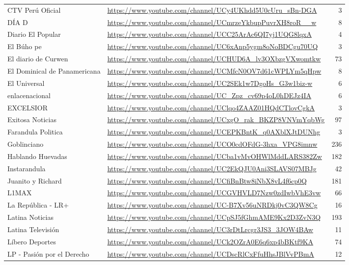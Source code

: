 \begin{longtable}{>{\raggedright\arraybackslash}p{50mm}>{\raggedright\arraybackslash}p{103mm}r}
CTV Perú Oficial & \url{https://www.youtube.com/channel/UCy4UKhdd5U0cUru_sBn-DGA} & 3 \\
DÍA D & \url{https://www.youtube.com/channel/UCmrzeYkbupPuvrXH8roR__w} & 8 \\
Diario El Popular & \url{https://www.youtube.com/channel/UCC25ArAc6QI7yj1UQG8lqxA} & 4 \\
El Búho pe & \url{https://www.youtube.com/channel/UC6xAnp5ygm8oNoBDCgu70UQ} & 3 \\
El diario de Curwen & \url{https://www.youtube.com/channel/UCHUD6A_lv3OXbzgVXwomtkw} & 73 \\
El Dominical de Panamericana & \url{https://www.youtube.com/channel/UCMfcN0OV7d61cWPLYm5qHpw} & 8 \\
El Universal & \url{https://www.youtube.com/channel/UC2SEk1w7DgoHs_G3w1biz-w} & 6 \\
enlacenacional & \url{https://www.youtube.com/channel/UC_Zpz_cv69p4oL0hDEJz4IA} & 6 \\
EXCELSIOR & \url{https://www.youtube.com/channel/UClqo4ZAAZ01HQdCTlovCgkA} & 3 \\
Exitosa Noticias & \url{https://www.youtube.com/channel/UCxgO_rak_BKZP8VNVmYqbWg} & 97 \\
Farandula Politica & \url{https://www.youtube.com/channel/UCEPKBntK_q0AXblXJtDUNhg} & 3 \\
Goblinciano & \url{https://www.youtube.com/channel/UCO0cdOFdG-3hxa_VPG8imnw} & 236 \\
Hablando Huevadas & \url{https://www.youtube.com/channel/UCba1vMvOHWlMddLARS382Zw} & 182 \\
Instarandula & \url{https://www.youtube.com/channel/UC2EkQJU0Ani3SLAVS07MBJg} & 42 \\
Juanito y Richard & \url{https://www.youtube.com/channel/UCfiBnBtw8iNbX8vL4f6cp0Q} & 181 \\
L1MAX & \url{https://www.youtube.com/channel/UCGVHVLD7Nzw0zdIwbVhE3vw} & 66 \\
La República - LR+ & \url{https://www.youtube.com/channel/UC-B7Xv56uNRDkj0vC3QW8Cg} & 16 \\
Latina Noticias & \url{https://www.youtube.com/channel/UCpSJ5fGhmAME9Kx2D3ZvN3Q} & 193 \\
Latina Televisión & \url{https://www.youtube.com/channel/UC3rDtLrcgr3JS3_3JOW4BAw} & 11 \\
Líbero Deportes & \url{https://www.youtube.com/channel/UCk2OZrA0E6q6xp4bBKtf9KA} & 74 \\
LP - Pasión por el Derecho & \url{https://www.youtube.com/channel/UCDscRlCxFfuHhsJBlVvPBmA} & 12 \\

\end{longtable}

